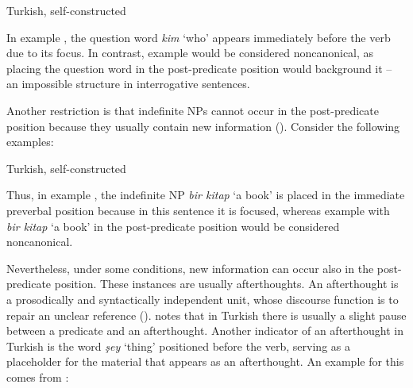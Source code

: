\ea \label{ex:key:5} Turkish, self-constructed \\
\z
\z


In example , the question word \textit{kim} ‘who’ appears immediately before the verb due to its focus. In contrast, example  would be considered noncanonical, as placing the question word in the post-predicate position would background it -- an impossible structure in interrogative sentences.

Another restriction is that indefinite NPs cannot occur in the post-predicate position because they usually contain new information (\citealt{Erguvanli1984}). Consider the following examples:

\ea%
  \label{ex:key:6}  Turkish, self-constructed \\
\z
\z

Thus, in example , the indefinite NP \textit{bir kitap} ‘a book’ is placed in the immediate preverbal position because in this sentence it is focused, whereas example  with \textit{bir kitap} ‘a book’ in the post-predicate position would be considered noncanonical.

Nevertheless, under some conditions, new information can occur also in the post-predicate position. These instances are usually afterthoughts. An afterthought is a prosodically and syntactically independent unit, whose discourse function is to repair an unclear reference (\citealt{Benz2008}). \citet{Erguvanli1984} notes that in Turkish there is usually a slight pause between a predicate and an afterthought. Another indicator of an afterthought in Turkish is the word \textit{şey} `thing' positioned before the verb, serving as a placeholder for the material that appears as an afterthought. An example for this comes from \citet[51]{Erguvanli1984}:


